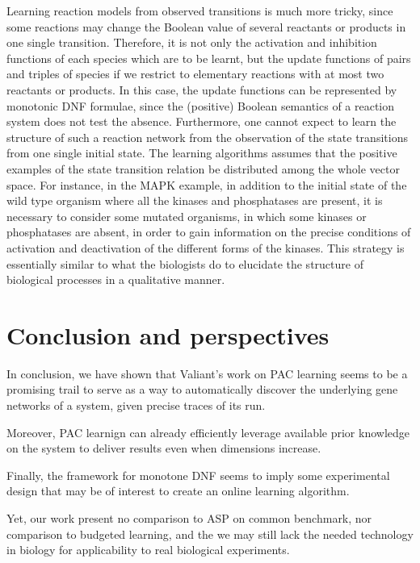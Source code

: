 \documentclass{llncs}
\begin{document}
  Learning reaction models from observed transitions is much more tricky,
  since some reactions may change the Boolean value of several reactants or products in one single transition.
  Therefore, it is not only the activation and inhibition functions of each species which are to be learnt,
  but the update functions of pairs and triples of species if we restrict to elementary reactions with at most two reactants or products.
  In this case, the update functions can be represented by monotonic DNF formulae, since the (positive) Boolean semantics of a reaction system does not test the absence.
Furthermore,   one cannot expect to learn the structure of such a reaction network
from the observation of the state transitions from one single initial state.
The learning algorithms assumes that the positive examples of the state transition relation be distributed
among the whole vector space.
For instance, in the MAPK example, in addition to the initial state of the wild type organism where all the kinases and phosphatases are present,
it is necessary to consider some mutated organisms, in which some kinases or phosphatases are absent,
in order to gain information on the precise conditions of activation and deactivation of the different forms of the kinases.
This strategy is essentially similar to what the biologists do to elucidate the structure of biological processes
in a qualitative manner.


\section{Conclusion and perspectives}

In conclusion, we have shown that Valiant's work on PAC learning seems to be a promising trail to serve as a way to automatically discover the underlying gene networks of a system, given precise traces of its run.

Moreover, PAC learnign can already efficiently leverage available prior knowledge on the system to deliver results even when dimensions increase.

Finally, the framework for monotone DNF seems to imply some experimental design that may be of interest to create an online learning algorithm.

Yet, our work present no comparison to ASP on common benchmark, nor comparison to budgeted learning, and the we may still lack the needed technology in biology for applicability to real biological experiments.



\end{document}
